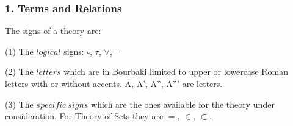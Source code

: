 \documentclass[]{scrartcl}
\begin{document}
\subsubsection{1. Terms and Relations}



The signs of a theory are:

(1) The $logical$ signs: $\square$, $\tau$, $\vee$, $\neg$

(2) The $letters$ which are in Bourbaki limited to upper or lowercase Roman letters with or without accents. A, A', A'', A''' are letters.

(3) The $specific \ signs$ which are the ones available for the theory under consideration. For Theory of Sets they are $=$, $\in$, $\subset$.
\end{document}
